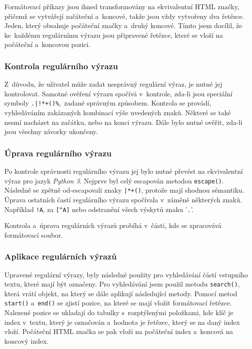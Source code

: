\documentclass[10pt,a4paper]{article}
\begin{document}
Formátovací příkazy jsou ihned transformovány na 
ekvivalentní HTML značky, přičemž se vytvářejí začáteční a~koncové,
takže jsou vždy vytvořeny dva řetězce. 
Jeden, který obsahuje počáteční 
značky a~druhý koncové.
Tímto jsem docílil, že ke~každému regulárnímu výrazu jsou připravené řetězce,
které se vloží na počáteční a~koncovou pozici.

\subsubsection{Kontrola regulárního výrazu}
Z~důvodu, že uživatel může zadat nesprávný regulární výraz, je nutné jej
kontrolovat. Samotné ověření výrazu spočívá v~kontrole, zda-li jsou speciální symboly
\texttt{.|!*+()\%},\ zadané správným způsobem. Kontrola se provádí,
vyhledáváním zakázaných kombinací výše uvedených znaků. Některé se také
nesmí nacházet na začátku, nebo na konci výrazu. Dále bylo nutné ověřit,
zda-li jsou všechny závorky ukončeny.

\subsubsection{Úprava regulárního výrazu}
Po kontrole správnosti regulárního výrazu jej bylo nutné převést na 
ekvivalentní výraz pro jazyk \emph{Python 3}. Nejprve byl celý escapován 
metodou \texttt{escape()}. Následně se zpětně od-escapovali znaky 
\texttt{|*+()}, protože mají shodnou sémantiku. Úprava ostatních častí 
regulárního výrazu spočívala v~záměně některých znaků. Například \texttt{!A}, 
za \texttt{[\textasciicircum A]} nebo odstranění všech výskytů
znaku '\texttt{.}'. 

Kontrola a~úprava regulárních výrazů probíhá
v~části, kde se zpracovává formátovací soubor. 

\subsubsection{Aplikace regulárních výrazů}
Upravené regulární výrazy, byly následně použity pro vyhledávání částí 
vstupního textu, které mají být označeny. Pro vyhledávání jsem použil metodu
\texttt{search()}, která vrátí objekt, na který se dále aplikují následující 
metody. Pomocí metod \texttt{start()} a~\texttt{end()} se zjistí pozice,
na které se mají vložit formátovací řetězce. Nalezené pozice se ukladají do tabulky
s~rozptýlenými položkami, kde klíč je index v~textu, který je označován
a~hodnota je řetězec, který se na daný index vloží. Počáteční HTML značka se pak
vloží na počáteční index a~koncová na koncový index.
\end{document}
